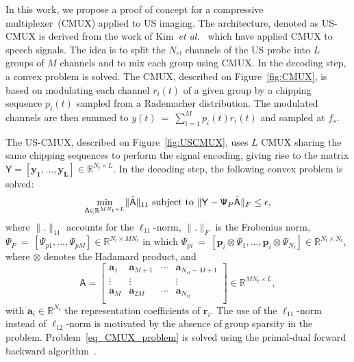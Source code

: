 \documentclass[9pt,conference]{IEEEtran}
\begin{document}
In this work, we propose a proof of concept for a compressive multiplexer~(CMUX) applied to US imaging. The architecture, denoted as US-CMUX is derived from the work of Kim~\textit{et al.}~\cite{kim2012} which have applied CMUX to speech signals. The idea is to split the $N_{el}$ channels of the US probe into $L$ groups of $M$ channels and to mix each group using CMUX. In the decoding step, a convex problem is solved.
The CMUX, described on Figure~\ref{fig:CMUX}, is based on modulating each channel $r_i \left(t\right)$ of a given group by a chipping sequence $p_i \left(t\right)$ sampled from a Rademacher distribution. The modulated channels are then summed to $y \left(t\right)~=~ \sum_{i=1}^{M} p_i \left(t\right) r_i \left(t\right)$ and sampled at $f_s$. 

The US-CMUX, described on Figure~\ref{fig:USCMUX}, uses $L$ CMUX sharing the same chipping sequences to perform the signal encoding, giving rise to the matrix $ \mathsf{Y} = \left[\bm{y_1}, ..., \bm{y_L}\right] \in \mathbb{R}^{N_t \times L}$. In the decoding step, the following convex problem is solved:
\begin{equation}
\label{eq_CMUX_problem}
\min_{\bar{\mathsf{A}} \in \mathbb{R}^{MN_t \times L}} \lVert \bar{\mathsf{A}} \lVert_{11}
\textnormal{ subject to } \| \mathsf{Y}- \mathsf{\Psi}_{P}\bar{\mathsf{A}}\|_F\leq\epsilon,
\end{equation}
where $\|.\|_{11}$ accounts for the $\ell_{11}$-norm, $\|.\|_F$ is the Frobenius norm, $\mathsf{\Psi}_{P}~=~\left[\mathsf{\Psi}_{p1}, ..., \mathsf{\Psi}_{pM}\right] \in \mathbb{R}^{N_t \times M N_t}$ in which $\mathsf{\Psi}_{pi}~=~\left[\bm{p}_i \otimes \Psi_1, ..., \bm{p}_i \otimes \Psi_{N_t}\right] \in \mathbb{R}^{N_t \times N_t}$, where $\otimes$ denotes the Hadamard product, and
\begin{equation*}
\mathsf{A}=
\begin{bmatrix}
\bm{a}_1 & \bm{a}_{M+1} & \dotsb & \bm{a}_{N_{el}-M+1}\\
\vdots & \vdots & & \vdots \\
\bm{a}_M & \bm{a}_{2M} & \dotsb &\bm{a}_{N_{el}} \\
\end{bmatrix} \in \mathbb{R}^{MN_t \times L},
\end{equation*}
 with $\bm{a}_i \in \mathbb{R}^{N_t}$ the representation coefficients of $\bm{r}_i$.
The use of the $\ell_{11}$-norm instead of $\ell_{12}$-norm is motivated by the absence of group sparsity in the problem. Problem~\eqref{eq_CMUX_problem} is solved using the primal-dual forward backward algorithm~\cite{combettes2014}.
\end{document}
